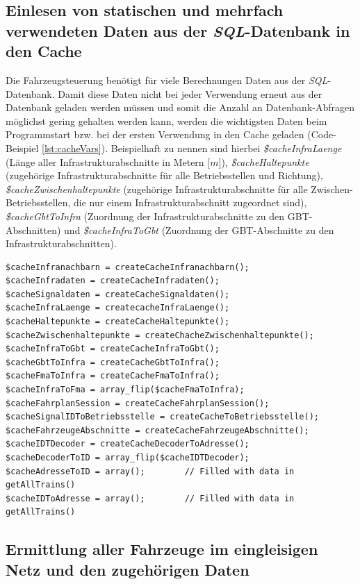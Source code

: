 \subsection{Einlesen von statischen und mehrfach verwendeten Daten aus der \textit{SQL}-Datenbank in den Cache} \label{main_1}
Die Fahrzeugsteuerung benötigt für viele Berechnungen Daten aus der \textit{SQL}-Datenbank. Damit diese Daten nicht bei jeder Verwendung erneut aus der Datenbank geladen werden müssen und somit die Anzahl an Datenbank-Abfragen möglichst gering gehalten werden kann, werden die wichtigsten Daten beim Programmstart bzw. bei der ersten Verwendung in den Cache geladen (Code-Beispiel \ref{lst:cacheVars}). Beispielhaft zu nennen sind hierbei \textit{\$cacheInfraLaenge} (Länge aller Infrastrukturabschnitte in Metern $[$$m$$]$), \textit{\$cacheHaltepunkte} (zugehörige Infrastrukturabschnitte für alle Betriebsstellen und Richtung), \textit{\$cacheZwischenhaltepunkte} (zugehörige Infrastrukturabschnitte für alle Zwischen-Betriebsstellen, die nur einem Infrastrukturabschnitt zugeordnet sind), \textit{\$cacheGbtToInfra} (Zuordnung der Infrastrukturabschnitte zu den GBT-Abschnitten) und \textit{\$cacheInfraToGbt} (Zuordnung der GBT-Abschnitte zu  den Infrastrukturabschnitten).
\begin{lstlisting}[caption={Deklaration und Initialisierung der Cache Variablen (main.php)},captionpos=b,label={lst:cacheVars}]
$cacheInfranachbarn = createCacheInfranachbarn();
$cacheInfradaten = createCacheInfradaten();
$cacheSignaldaten = createCacheSignaldaten();
$cacheInfraLaenge = createcacheInfraLaenge();
$cacheHaltepunkte = createCacheHaltepunkte();
$cacheZwischenhaltepunkte = createChacheZwischenhaltepunkte();
$cacheInfraToGbt = createCacheInfraToGbt();
$cacheGbtToInfra = createCacheGbtToInfra();
$cacheFmaToInfra = createCacheFmaToInfra();
$cacheInfraToFma = array_flip($cacheFmaToInfra);
$cacheFahrplanSession = createCacheFahrplanSession();
$cacheSignalIDToBetriebsstelle = createCacheToBetriebsstelle();
$cacheFahrzeugeAbschnitte = createCacheFahrzeugeAbschnitte();
$cacheIDTDecoder = createCacheDecoderToAdresse();
$cacheDecoderToID = array_flip($cacheIDTDecoder);
$cacheAdresseToID = array();		// Filled with data in getAllTrains()
$cacheIDToAdresse = array();		// Filled with data in getAllTrains()
\end{lstlisting}
\subsection{Ermittlung aller Fahrzeuge im eingleisigen Netz und den zugehörigen Daten} \label{main_2}

